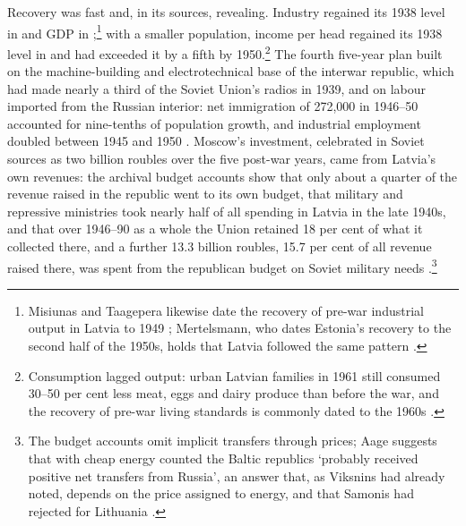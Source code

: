 Recovery was fast and, in its sources, revealing. Industry regained its 1938 level in  and GDP in ;\footnote{Misiunas and Taagepera likewise date the recovery of pre-war industrial output in Latvia to 1949 \parencite[113]{years_of_dependence}; Mertelsmann, who dates Estonia's recovery to the second half of the 1950s, holds that Latvia followed the same pattern \parencite[167--9]{mertelsmann_2003_there}.} with a smaller population, income per head regained its 1938 level in \lvREGAINthirtyeight{} and had exceeded it by a fifth by 1950.\footnote{Consumption lagged output: urban Latvian families in 1961 still consumed 30--50 per cent less meat, eggs and dairy produce than before the war, and the recovery of pre-war living standards is commonly dated to the 1960s \parencites[185--6]{years_of_dependence}[38]{puur_2019_turbulent}.} The fourth five-year plan built on the machine-building and electrotechnical base of the interwar republic, which had made nearly a third of the Soviet Union's radios in 1939, and on labour imported from the Russian interior: net immigration of 272,000 in 1946--50 accounted for nine-tenths of population growth, and industrial employment doubled between 1945 and 1950 \parencites[46--7]{eglite_2015_migracija}[233--4]{krumins_2017_sovetizacijas}[244]{vaskela_2014_lietuvos}. Moscow's investment, celebrated in Soviet sources as two billion roubles over the five post-war years, came from Latvia's own revenues: the archival budget accounts show that only about a quarter of the revenue raised in the republic went to its own budget, that military and repressive ministries took nearly half of all spending in Latvia in the late 1940s, and that over 1946--90 as a whole the Union retained 18 per cent of what it collected there, and a further 13.3 billion roubles, 15.7 per cent of all revenue raised there, was spent from the republican budget on Soviet military needs \parencites[251--7]{krumins_2017_sovetizacijas}[9]{pazdere_2015_visparejs}{gatis_compensations}.\footnote{The budget accounts omit implicit transfers through prices; Aage suggests that with cheap energy counted the Baltic republics `probably received positive net transfers from Russia', an answer that, as Viksnins had already noted, depends on the price assigned to energy, and that Samonis had rejected for Lithuania \parencites[102]{aage_1997_public}[252]{viksnins_1986_latvian}[6--7]{samonis_1995_transforming}.}

